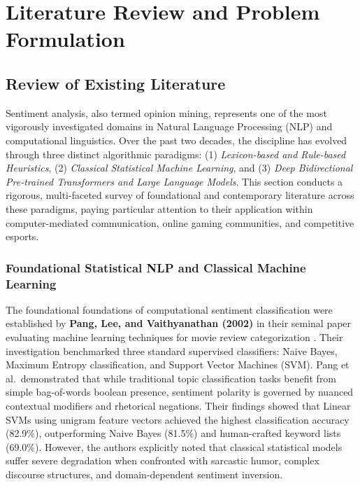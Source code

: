 \chapter{Literature Review and Problem Formulation}
\label{chap:literature_review}

\section{Review of Existing Literature}
\label{sec:lit_review}

Sentiment analysis, also termed opinion mining, represents one of the most vigorously investigated domains in Natural Language Processing (NLP) and computational linguistics. Over the past two decades, the discipline has evolved through three distinct algorithmic paradigms: (1) \textit{Lexicon-based and Rule-based Heuristics}, (2) \textit{Classical Statistical Machine Learning}, and (3) \textit{Deep Bidirectional Pre-trained Transformers and Large Language Models}. This section conducts a rigorous, multi-faceted survey of foundational and contemporary literature across these paradigms, paying particular attention to their application within computer-mediated communication, online gaming communities, and competitive esports.

\subsection{Foundational Statistical NLP and Classical Machine Learning}

The foundational foundations of computational sentiment classification were established by \textbf{Pang, Lee, and Vaithyanathan (2002)} in their seminal paper evaluating machine learning techniques for movie review categorization \cite{pang2002thumbs}. Their investigation benchmarked three standard supervised classifiers: Naive Bayes, Maximum Entropy classification, and Support Vector Machines (SVM). Pang et al.\ demonstrated that while traditional topic classification tasks benefit from simple bag-of-words boolean presence, sentiment polarity is governed by nuanced contextual modifiers and rhetorical negations. Their findings showed that Linear SVMs using unigram feature vectors achieved the highest classification accuracy (82.9\%), outperforming Naive Bayes (81.5\%) and human-crafted keyword lists (69.0\%). However, the authors explicitly noted that classical statistical models suffer severe degradation when confronted with sarcastic humor, complex discourse structures, and domain-dependent sentiment inversion.

